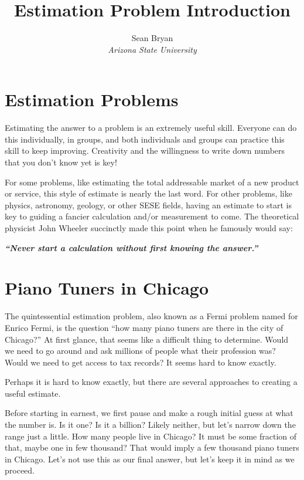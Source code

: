 \documentclass[12pt]{article}
\title{Estimation Problem Introduction}
\author{Sean Bryan\\\textit{Arizona State University}}
\date{}
\begin{document}
\maketitle

\thispagestyle{fancy}

\section{Estimation Problems}

Estimating the answer to a problem is an extremely useful skill. Everyone can do this individually, in groups, and both individuals and groups can practice this skill to keep improving. Creativity and the willingness to write down numbers that you don't know yet is key!

For some problems, like estimating the total addressable market of a new product or service, this style of estimate is nearly the last word. For other problems, like physics, astronomy, geology, or other SESE fields, having an estimate to start is key to guiding a fancier calculation and/or measurement to come. The theoretical physicist John Wheeler succinctly made this point when he famously would say:

\begin{center}
    \textbf{\textit{``Never start a calculation without first knowing the answer.''}}
\end{center}

\section{Piano Tuners in Chicago}

The quintessential estimation problem, also known as a Fermi problem named for Enrico Fermi, is the question ``how many piano tuners are there in the city of Chicago?'' At first glance, that seems like a difficult thing to determine. Would we need to go around and ask millions of people what their profession was? Would we need to get access to tax records? It seems hard to know exactly.

Perhaps it is hard to know exactly, but there are several approaches to creating a useful estimate.

Before starting in earnest, we first pause and make a rough initial guess at what the number is. Is it one? Is it a billion? Likely neither, but let's narrow down the range just a little. How many people live in Chicago? It must be some fraction of that, maybe one in few thousand? That would imply a few thousand piano tuners in Chicago. Let's not use this as our final answer, but let's keep it in mind as we proceed.
\end{document}
